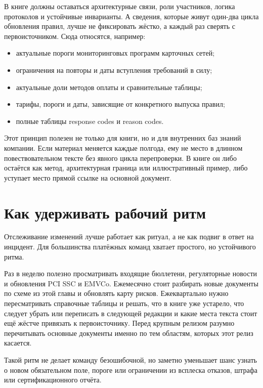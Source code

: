 В книге должны оставаться архитектурные связи, роли участников,
логика протоколов и устойчивые инварианты. А сведения, которые
живут один-два цикла обновления правил, лучше не фиксировать
жёстко, а каждый раз сверять с первоисточником. Сюда относятся,
например:
\begin{itemize}
  \item актуальные пороги мониторинговых программ карточных сетей;
  \item ограничения на повторы и даты вступления требований в силу;
  \item актуальные доли методов оплаты и сравнительные таблицы;
  \item тарифы, пороги и даты, зависящие от конкретного выпуска правил;
  \item полные таблицы response codes и reason codes.
\end{itemize}
Этот принцип полезен не только для книги, но и для внутренних
баз знаний компании. Если материал меняется каждые полгода,
ему не место в длинном повествовательном тексте без явного цикла
перепроверки. В книге он либо остаётся как метод, архитектурная
граница или иллюстративный пример, либо уступает место прямой
ссылке на основной документ.

\section{Как удерживать рабочий ритм}
\label{sec:ps-tracking-rhythm}

Отслеживание изменений лучше работает как ритуал, а не как подвиг
в ответ на инцидент. Для большинства платёжных команд хватает
простого, но устойчивого ритма.

Раз в неделю полезно просматривать входящие бюллетени,
регуляторные новости и обновления PCI SSC и EMVCo. Ежемесячно
стоит разбирать новые документы по схеме из этой главы
и обновлять карту рисков. Ежеквартально нужно пересматривать
справочные таблицы и решать, что в книге уже устарело, что
следует убрать или переписать в следующей редакции и какие места
текста стоит ещё жёстче привязать к первоисточнику. Перед крупным
релизом разумно перечитывать основные документы именно
по тем областям, которых этот релиз касается.

Такой ритм не делает команду безошибочной, но заметно уменьшает
шанс узнать о новом обязательном поле, пороге или ограничении
из всплеска отказов, штрафа или сертификационного отчёта.

